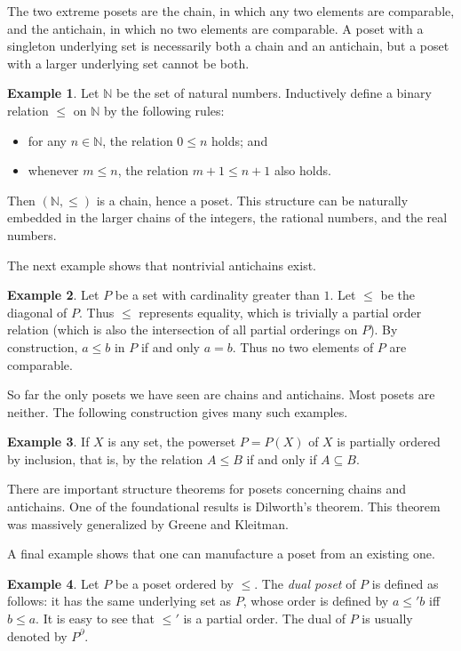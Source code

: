 \documentclass[12pt]{article}
\theoremstyle{definition}
\newtheorem{example}{Example}
\begin{document}
The two extreme posets are the chain, in which any two elements are
comparable, and the antichain, in which no two elements are
comparable.  A poset with a singleton underlying set is necessarily
both a chain and an antichain, but a poset with a larger underlying
set cannot be both.

\begin{example} 
Let $\mathbb{N}$ be the set of natural numbers.  Inductively define a
binary relation $\le$ on $\mathbb{N}$ by the following rules:
\begin{itemize} 
\item 
for any $n\in\mathbb{N}$, the relation $0\le n$ holds; and

\item
whenever $m\le n$, the relation $m+1\le n+1$ also holds.
\end{itemize}
Then $(\mathbb{N},\le)$ is a chain, hence a poset.  This structure can
be naturally embedded in the larger chains of the integers, the
rational numbers, and the real numbers.  
\end{example}

The next example shows that nontrivial antichains exist.

\begin{example}
Let $P$ be a set with cardinality greater than $1$.  Let $\le$ be the
diagonal of $P$.  Thus $\le$ represents equality, which is trivially a
partial order relation (which is also the intersection of all partial
orderings on $P$).  By construction, $a\le b$ in $P$ if and only
$a=b$.  Thus no two elements of $P$ are comparable.
\end{example}

So far the only posets we have seen are chains and antichains.  Most
posets are neither.  The following construction gives many such
examples.

\begin{example}
If $X$ is any set, the powerset $P=P(X)$ of $X$ is partially ordered
by inclusion, that is, by the relation $A\le B$ if and only if
$A\subseteq B$.
\end{example}

There are important structure theorems for posets concerning chains
and antichains.  One of the foundational results is Dilworth's
theorem.  This theorem was massively generalized by Greene and
Kleitman.

A final example shows that one can manufacture a poset from an existing one.

\begin{example}
Let $P$ be a poset ordered by $\le$.   The \emph{dual poset} of $P$ is defined as 
follows: it has the same underlying set as $P$, whose order is defined by $a\le'b$ 
iff $b\le a$.  It is easy to see that $\le'$ is a partial order.  The dual of $P$ 
is usually denoted by $P^{\partial}$.
\end{example}
\end{document}
